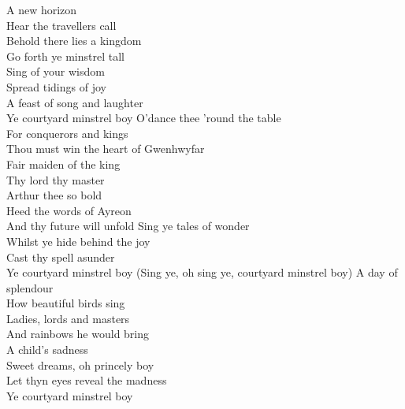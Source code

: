 A new horizon\\
Hear the travellers call\\
Behold there lies a kingdom\\
Go forth ye minstrel tall\\
Sing of your wisdom\\
Spread tidings of joy\\
A feast of song and laughter\\
Ye courtyard minstrel boy
\hops
O'dance thee 'round the table\\
For conquerors and kings\\
Thou must win the heart of Gwenhwyfar\\
Fair maiden of the king\\
Thy lord thy master\\
Arthur thee so bold\\
Heed the words of Ayreon\\
And thy future will unfold
\hop
Sing ye tales of wonder\\
Whilst ye hide behind the joy\\
Cast thy spell asunder\\
Ye courtyard minstrel boy
\hops
(Sing ye, oh sing ye, courtyard minstrel boy)
\hops
A day of splendour\\
How beautiful birds sing\\
Ladies, lords and masters\\
And rainbows he would bring\\
A child's sadness\\
Sweet dreams, oh princely boy\\
Let thyn eyes reveal the madness\\
Ye courtyard minstrel boy


